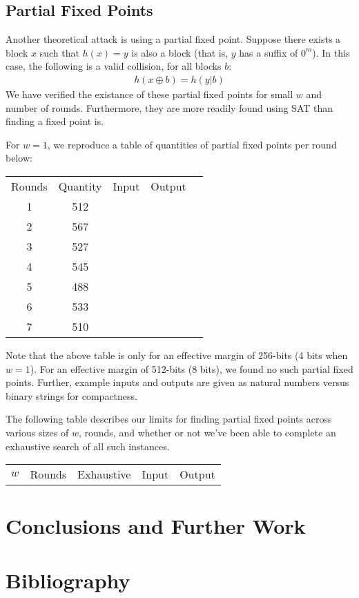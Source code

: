 \documentclass[10pt,twocolumn,twoside]{pnas-new}
\begin{document}
\subsection{Partial Fixed Points} \label{sec:f:partial}

Another theoretical attack is using a partial fixed point. Suppose there
exists a block $x$ such that $h(x) = y$ is also a block (that is, $y$ has
a suffix of $0^{m}$). In this case, the following is a valid collision,
for all blocks $b$:
\begin{align*}
    h(x \oplus b) = h(y | b)
\end{align*}
We have verified the existance of these partial fixed points for small
$w$ and number of rounds. Furthermore, they are more readily found using SAT
than finding a fixed point is.

For $w=1$, we reproduce a table of quantities of partial fixed points per round
below:
\begin{tabular}{c c c c c} \label{tab:f:p:1}
    Rounds & Quantity & Input & Output \\
    1 & 512 & & \\
    2 & 567 & & \\
    3 & 527 & & \\
    4 & 545 & & \\
    5 & 488 & & \\
    6 & 533 & & \\
    7 & 510 & & \\
\end{tabular}
Note that the above table is only for an effective margin of 256-bits (4 bits
when $w=1$). For an effective margin of 512-bits (8 bits), we found no such
partial fixed points. Further, example inputs and outputs are given as natural
numbers versus binary strings for compactness.

The following table describes our limits for finding partial fixed points
across various sizes of $w$, rounds, and whether or not we've been able to
complete an exhaustive search of all such instances.
\begin{tabular}{c c c c c} \label{tab:f:p:2}
    $w$ & Rounds & Exhaustive & Input & Output \\
\end{tabular}




\section{Conclusions and Further Work} \label{sec:conclusion}


\section{Bibliography} \label{sec:bibliography}


\end{document}
